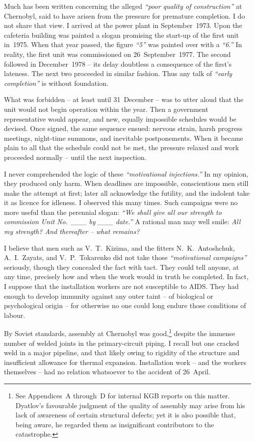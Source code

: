 \documentclass[openright]{bookest}
\begin{document}

Much has been written concerning the alleged \textit{``poor quality of construction''} at Chernobyl, said to have arisen from the pressure for premature completion. I do not share that view. I arrived at the power plant in September~1973. Upon the cafeteria building was painted a slogan promising the start-up of the first unit in~1975. When that year passed, the figure \textit{``5''} was painted over with a \textit{``6.''} In reality, the first unit was commissioned on 26~September~1977. The second followed in December~1978 -- its delay doubtless a consequence of the first's lateness. The next two proceeded in similar fashion. Thus any talk of \textit{``early completion''} is without foundation.

What was forbidden -- at least until 31~December -- was to utter aloud that the unit would not begin operation within the year. Then a government representative would appear, and new, equally impossible schedules would be devised. Once signed, the same sequence ensued: nervous strain, harsh progress meetings, night-time summons, and inevitable postponements. When it became plain to all that the schedule could not be met, the pressure relaxed and work proceeded normally -- until the next inspection.

I never comprehended the logic of these \textit{``motivational injections.''} In my opinion, they produced only harm. When deadlines are impossible, conscientious men still make the attempt at first; later all acknowledge the futility, and the indolent take it as licence for idleness. I observed this many times. Such campaigns were no more useful than the perennial slogan: \textit{``We shall give all our strength to commission Unit No.~\_\_\_ by \_\_\_ date.''} A rational man may well smile: \textit{All my strength? And thereafter -- what remains?}


I believe that men such as V.~T.~Kizima, and the fitters N.~K.~Antoshchuk, A.~I.~Zayats, and V.~P.~Tokarenko did not take those \textit{``motivational campaigns''} seriously, though they concealed the fact with tact. They could tell anyone, at any time, precisely how and when the work would in truth be completed. In fact, I suppose that the installation workers are not susceptible to AIDS. They had enough to develop immunity against any outer taint -- of biological or psychological origin -- for otherwise no one could long endure those conditions of labour.

By Soviet standards, assembly at Chernobyl was good,\footnote{See Appendices~A through~D for internal KGB reports on this matter. Dyatlov's favourable judgment of the quality of assembly may arise from his lack of awareness of certain structural defects; yet it is also possible that, being aware, he regarded them as insignificant contributors to the catastrophe.} despite the immense number of welded joints in the primary-circuit piping. I recall but one cracked weld in a major pipeline, and that likely owing to rigidity of the structure and insufficient allowance for thermal expansion. Installation work -- and the workers themselves -- had no relation whatsoever to the accident of 26~April.
\end{document}
